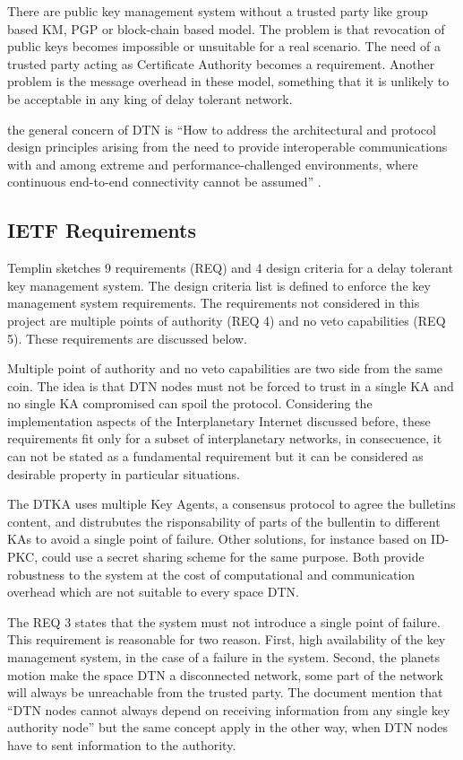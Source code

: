 There are public key management system without a trusted party like group based KM, PGP or block-chain based model. The problem is that revocation of public keys becomes impossible or unsuitable for a real scenario. The need of a trusted party acting as Certificate Authority becomes a requirement. Another problem is the message overhead in these model, something that it is unlikely to be acceptable in any king of delay tolerant network. 



the general concern of DTN is ``How to address the architectural and protocol design principles
arising from the need to provide interoperable communications with and among extreme and performance-challenged environments, where continuous end-to-end connectivity cannot be assumed'' \cite{caini2011delay}.

\subsection{IETF Requirements}

Templin \cite{templin-dtnskmreq-00} sketches 9 requirements (REQ) and 4 design criteria for a delay tolerant key management system. The design criteria list is defined to enforce the key management system requirements. The requirements not considered in this project are multiple points of authority (REQ 4) and no veto capabilities (REQ 5). These requirements are discussed below. 

Multiple point of authority and no veto capabilities are two side from the same coin. The idea is that DTN nodes must not be forced to trust in a single KA and no single KA compromised can spoil the protocol. Considering the implementation aspects of the Interplanetary Internet discussed before, these requirements fit only for a subset of interplanetary networks, in consecuence, it can not be stated as a fundamental requirement but it can be considered as desirable property in particular situations. 

The DTKA uses multiple Key Agents, a consensus protocol to agree the bulletins content, and distrubutes the risponsability of parts of the bullentin to different KAs to avoid a single point of failure. Other solutions, for instance based on ID-PKC, could use a secret sharing scheme for the same purpose. Both provide robustness to the system at the cost of computational and communication overhead which are not suitable to every space DTN. 


The REQ 3 states that the system must not introduce a single point of failure. This requirement is reasonable for two reason. First, high availability of the key management system, in the case of a failure in the system. Second, the planets motion make the space DTN a disconnected network, some part of the network will always be unreachable from the trusted party. The document mention that ``DTN nodes cannot always depend on receiving information from any single key authority node'' but the same concept apply in the other way, when DTN nodes have to sent information to the authority. 

